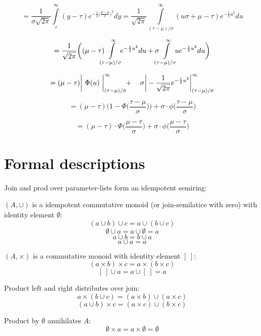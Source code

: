 \documentclass[english]{article}
\begin{document}
$$ = \frac{1}{\sigma\sqrt{2\pi}} \int\limits_{\tau}^{\infty}(y-\tau)e^{-\frac{1}{2}\big(\frac{y-\mu}{\sigma}\big)^2}dy =
\frac{1}{\sqrt{2\pi}} \int\limits_{(\tau-\mu)/\sigma}^{\infty}(u\sigma+\mu-\tau)e^{-\frac{1}{2}u^2}du$$

$$=\frac{1}{\sqrt{2\pi}}\bigg((\mu-\tau) \mkern-12mu \int\limits_{(\tau-\mu)/\sigma}^{\infty} \mkern-10mu e^{-\frac{1}{2}u^2}du + \sigma \mkern-12mu \int\limits_{(\tau-\mu)/\sigma}^{\infty} \mkern-10mu u e^{-\frac{1}{2}u^2}du \bigg)$$

$$=(\mu-\tau)\bigg|\ \Phi(u)\ \bigg|_{(\tau-\mu)/\sigma}^{\infty} \mkern-6mu + \ \ \ \sigma\bigg|-\frac{1}{\sqrt{2\pi}}e^{-\frac{1}{2}u^2}\bigg|_{(\tau-\mu)/\sigma}^{\infty}$$

$$=(\mu-\tau)\bigg(1-\Phi\bigg(\frac{\tau-\mu}{\sigma}\bigg)\bigg) + \sigma \cdot \phi \bigg(\frac{\tau-\mu}{\sigma}\bigg)$$

$$ = (\mu - \tau) \cdot \Phi \bigg(\frac{\mu-\tau}{\sigma}\bigg) + \sigma \cdot \phi \bigg(\frac{\mu-\tau}{\sigma}\bigg)$$

\section{Formal descriptions}
Join and prod over parameter-lists form an idempotent semiring:

$(A, \cup)$ is a idempotent commutative monoid (or join-semilatice with zero) with identity element $\emptyset$:
$$(a \cup b) \cup c = a \cup (b \cup c)$$
$$\emptyset \cup a = a \cup \emptyset = a$$
$$a \cup b = b \cup a$$
$$a \cup a = a$$

$(A, \times)$ is a commutative monoid with identity element $[\ ]$:
$$(a \times b) \times c = a \times (b \times c)$$
$$[\ ] \cup a = a \cup [\ ] = a$$

Product left and right distributes over join:
$$a\times(b \cup c) = (a\times b) \cup (a\times c)$$
$$(a \cup b)\times c = (a\times c) \cup (b\times c)$$

Product by $\emptyset$ annihilates $A$:
$$\emptyset \times a = a \times \emptyset = \emptyset$$



\printbibliography
\end{document}
